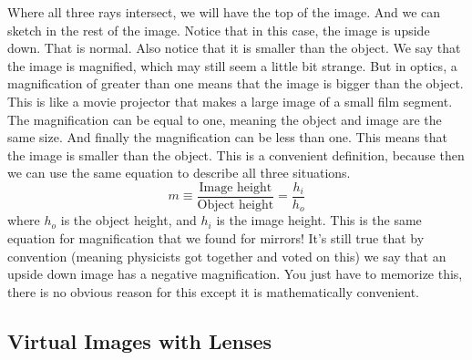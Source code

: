 \documentclass{article}
\begin{document}
Where all three rays intersect,
we will have the top of the image. And we can sketch in the rest of
the image. Notice that in this case, the image is upside down. That is
normal. Also notice that it is smaller than the object. We say that the
image is magnified, which may still seem a little bit strange. But in
optics, a magnification of greater than one means that the image is bigger
than the object. This is like a movie projector that makes a large image of
a small film segment. The magnification can be equal to one, meaning the
object and image are the same size. And finally the magnification can be
less than one. This means that the image is smaller than the object. This is
a convenient definition, because then we can use the same equation to
describe all three situations.%
\[
m\equiv \frac{\text{Image height}}{\text{Object height}}=\frac{h_{i}}{h_{o}}
\]%
where $h_{o}$ is the object height, and $h_{i}$ is the image height. This is
the same equation for magnification that we found for mirrors! It's still
true that by convention (meaning physicists got together and voted on this)
we say that an upside down image has a negative magnification. You just have
to memorize this, there is no obvious reason for this except it is
mathematically convenient.

\subsection{Virtual Images with Lenses}
\end{document}
